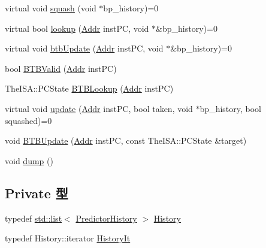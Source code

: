 \begin{DoxyCompactItemize}
\item 
virtual void \hyperlink{classBPredUnit_a2af63ba741727bdf58e2b2dc22a912ed}{squash} (void $\ast$bp\_\-history)=0
\item 
virtual bool \hyperlink{classBPredUnit_a5632fdea0abc34f7d68d8445a7a6c166}{lookup} (\hyperlink{base_2types_8hh_af1bb03d6a4ee096394a6749f0a169232}{Addr} instPC, void $\ast$\&bp\_\-history)=0
\item 
virtual void \hyperlink{classBPredUnit_a7b687ebde63095b00a0b083ba6607cd4}{btbUpdate} (\hyperlink{base_2types_8hh_af1bb03d6a4ee096394a6749f0a169232}{Addr} instPC, void $\ast$\&bp\_\-history)=0
\item 
bool \hyperlink{classBPredUnit_a93ec70ede183b1d9c34cef98153c01f8}{BTBValid} (\hyperlink{base_2types_8hh_af1bb03d6a4ee096394a6749f0a169232}{Addr} instPC)
\item 
TheISA::PCState \hyperlink{classBPredUnit_a391197cbd3ef7a4dd06e561671f1347a}{BTBLookup} (\hyperlink{base_2types_8hh_af1bb03d6a4ee096394a6749f0a169232}{Addr} instPC)
\item 
virtual void \hyperlink{classBPredUnit_ab00dd76dc9f830cdae0edc72357c013a}{update} (\hyperlink{base_2types_8hh_af1bb03d6a4ee096394a6749f0a169232}{Addr} instPC, bool taken, void $\ast$bp\_\-history, bool squashed)=0
\item 
void \hyperlink{classBPredUnit_a9c9cad624af5c71140d7f402ee4f1a2c}{BTBUpdate} (\hyperlink{base_2types_8hh_af1bb03d6a4ee096394a6749f0a169232}{Addr} instPC, const TheISA::PCState \&target)
\item 
void \hyperlink{classBPredUnit_accd2600060dbaee3a3b41aed4034c63c}{dump} ()
\end{DoxyCompactItemize}
\subsection*{Private 型}
\begin{DoxyCompactItemize}
\item 
typedef \hyperlink{classstd_1_1list}{std::list}$<$ \hyperlink{structBPredUnit_1_1PredictorHistory}{PredictorHistory} $>$ \hyperlink{classBPredUnit_a4b4610c4c56c4d7061849e23009cbb4b}{History}
\item 
typedef History::iterator \hyperlink{classBPredUnit_abaefb3dcd19a61b2383910e6efb536eb}{HistoryIt}
\end{DoxyCompactItemize}
